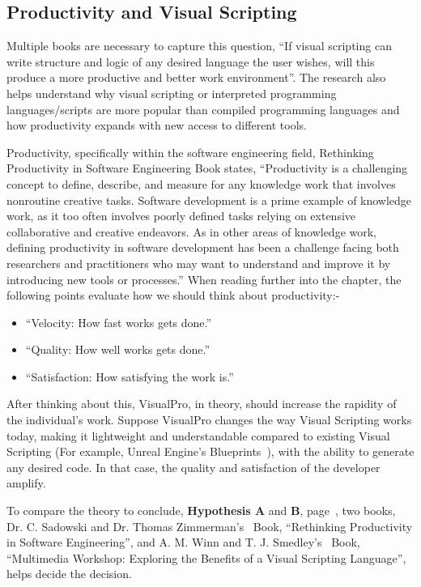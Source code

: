 \documentclass[conference]{IEEEtran}
\begin{document}
      \subsection{Productivity and Visual Scripting}
        Multiple books are necessary to capture this question, ``If visual scripting can write structure and logic of any desired language the user wishes, will this produce a more productive and better work environment''. The research also helps understand why visual scripting or interpreted programming languages/scripts are more popular than compiled programming languages and how productivity expands with new access to different tools.

        Productivity, specifically within the software engineering field, Rethinking Productivity in Software Engineering Book states, ``Productivity is a challenging concept to define, describe, and measure for any knowledge work that involves nonroutine creative tasks. Software development is a prime example of knowledge work, as it too often involves poorly defined tasks relying on extensive collaborative and creative endeavors. As in other areas of knowledge work, defining productivity in software development has been a challenge facing both researchers and practitioners who may want to understand and improve it by introducing new tools or processes.'' When reading further into the chapter, the following points evaluate how we should think about productivity:-

        \begin{itemize}
          \item ``Velocity: How fast works gets done.''
          \item ``Quality: How well works gets done.''
          \item ``Satisfaction: How satisfying the work is.''
        \end{itemize}

        After thinking about this, VisualPro, in theory, should increase the rapidity of the individual’s work. Suppose VisualPro changes the way Visual Scripting works today, making it lightweight and understandable compared to existing Visual Scripting (For example, Unreal Engine's Blueprints~\cite{unreal_engine_introduction_nodate}), with the ability to generate any desired code. In that case, the quality and satisfaction of the developer amplify.

        To compare the theory to conclude, \textbf{Hypothesis A} and \textbf{B}, page~\pageref{abstract}, two books, Dr. C. Sadowski and Dr. Thomas Zimmerman's~\cite{dr_caitlin_sadowski_rethinking_2019} Book, ``Rethinking Productivity in Software Engineering'', and A. M. Winn and T. J. Smedley’s~\cite{winn_multimedia_1998} Book, ``Multimedia Workshop: Exploring the Benefits of a Visual Scripting Language'', helps decide the decision.
\end{document}
